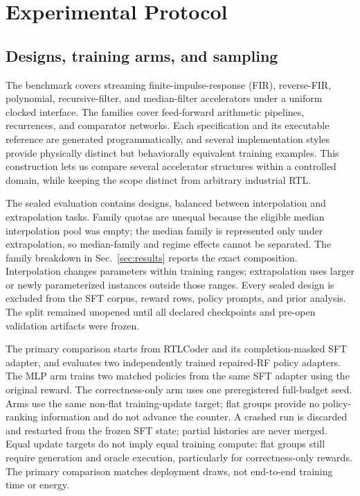 \section{Experimental Protocol}
\label{sec:setup}

\subsection{Designs, training arms, and sampling}

The benchmark covers streaming finite-impulse-response (FIR), reverse-FIR,
polynomial, recursive-filter, and median-filter accelerators under a uniform
clocked interface.  The families cover feed-forward arithmetic pipelines,
recurrences, and comparator networks.  Each specification and its executable
reference are generated programmatically, and several implementation styles
provide physically distinct but behaviorally equivalent training examples.
This construction lets us compare several accelerator structures within a
controlled domain, while keeping the scope distinct from arbitrary industrial RTL.

The sealed evaluation contains  designs,
balanced between  interpolation and
 extrapolation tasks.  Family quotas are
unequal because the eligible median interpolation pool was empty; the median
family is represented only under extrapolation, so median-family and regime
effects cannot be separated.  The family breakdown in
Sec.~\ref{sec:results} reports the exact composition.  Interpolation changes parameters within
training ranges; extrapolation uses larger or newly parameterized instances
outside those ranges.  Every sealed design is excluded from the SFT corpus,
reward rows, policy prompts, and prior analysis.  The split remained unopened
until all declared checkpoints and pre-open validation artifacts were frozen.


The primary comparison starts from RTLCoder and its completion-masked SFT
adapter, and evaluates
two independently trained repaired-RF policy adapters. The MLP arm trains two
matched policies from the same SFT adapter using the original reward.  The
correctness-only arm uses one preregistered full-budget seed.  Arms use the same non-flat training-update target; flat groups provide no
policy-ranking information and do not advance the counter.  A crashed run is discarded and
restarted from the frozen SFT state; partial histories are never merged.
Equal update targets do not imply equal training compute: flat groups still
require generation and oracle execution, particularly for correctness-only
rewards.  The primary comparison matches deployment draws, not end-to-end
training time or energy.

